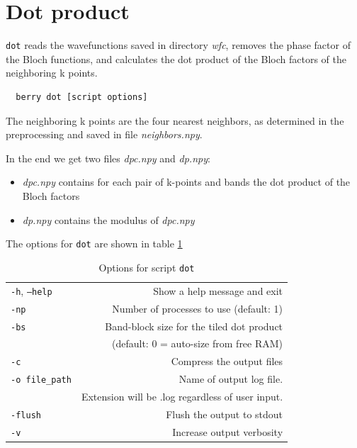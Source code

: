 \documentclass[a4paper,12pt]{report}
\begin{document}
\section{Dot product}

\texttt{dot} reads the wavefunctions saved in directory \emph{wfc},
removes the phase factor of the Bloch functions, and calculates the dot product
of the Bloch factors of the neighboring k points.

\begin{verbatim}
  berry dot [script options]
\end{verbatim}

The neighboring k points are the four nearest neighbors, as determined in the preprocessing
and saved in file \emph{neighbors.npy}.

In the end we get two files \emph{dpc.npy} and \emph{dp.npy}:
\begin{itemize}
 \item \emph{dpc.npy} contains for each pair of k-points and bands the dot product of the Bloch factors
 \item \emph{dp.npy} contains the modulus of \emph{dpc.npy}
\end{itemize}
The options for \texttt{dot} are shown in table \ref{tab:options_dot}

\begin{table}[ht]
 \centering
 \caption{Options for script \texttt{dot}}\label{tab:options_dot}
\begin{tabular}[]{lr}
\hline
  \texttt{-h}, \texttt{--help}  &\hspace*{2cm} Show a help message and exit \\
  \texttt{-np}                  & Number of processes to use (default: 1) \\
  \texttt{-bs}                  & Band-block size for the tiled dot product\\
                                & (default: 0 = auto-size from free RAM) \\
  \texttt{-c}                   & Compress the output files \\
  \texttt{-o file\_path}        & Name of output log file.\\
                                & Extension will be .log regardless of user input. \\
  \texttt{-flush}               & Flush the output to stdout \\
  \texttt{-v}                   & Increase output verbosity \\
  \hline
\end{tabular}
\end{table}
\end{document}
